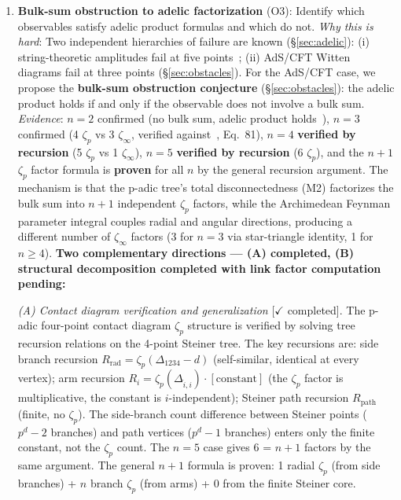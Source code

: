 \documentclass[11pt,a4paper]{article}
\begin{document}
\begin{enumerate}[leftmargin=2em]
    \item \textbf{Bulk-sum obstruction to adelic factorization} (O3): Identify which observables satisfy adelic product formulas and which do not. \textit{Why this is hard}: Two independent hierarchies of failure are known (\S\ref{sec:adelic}): (i) string-theoretic amplitudes fail at five points~\cite{J22}; (ii) AdS/CFT Witten diagrams fail at three points (\S\ref{sec:obstacles}). For the AdS/CFT case, we propose the \textbf{bulk-sum obstruction conjecture} (\S\ref{sec:obstacles}): the adelic product holds if and only if the observable does not involve a bulk sum. \textit{Evidence}: $n=2$ confirmed (no bulk sum, adelic product holds~\cite{HSYZ20}), $n=3$ confirmed (4 $\zeta_p$ vs 3 $\zeta_\infty$, verified against~\cite{HJ24}, Eq.~81), $n=4$ \textbf{verified by recursion} (5 $\zeta_p$ vs 1 $\zeta_\infty$), $n=5$ \textbf{verified by recursion} (6 $\zeta_p$), and the $n{+}1$ $\zeta_p$ factor formula is \textbf{proven} for all $n$ by the general recursion argument. The mechanism is that the p-adic tree's total disconnectedness (M2) factorizes the bulk sum into $n{+}1$ independent $\zeta_p$ factors, while the Archimedean Feynman parameter integral couples radial and angular directions, producing a different number of $\zeta_\infty$ factors (3 for $n=3$ via star-triangle identity, 1 for $n \geq 4$). \textbf{Two complementary directions --- (A) completed, (B) structural decomposition completed with link factor computation pending:}
    
    \textit{(A) Contact diagram verification and generalization} [$\checkmark$ completed]. The p-adic four-point contact diagram $\zeta_p$ structure is verified by solving tree recursion relations on the 4-point Steiner tree. The key recursions are: side branch recursion $R_{\text{rad}} = \zeta_p(\Delta_{1234}{-}d)$ (self-similar, identical at every vertex); arm recursion $R_i = \zeta_p(\Delta_{\hat{i},i}) \cdot [\text{constant}]$ (the $\zeta_p$ factor is multiplicative, the constant is $i$-independent); Steiner path recursion $R_{\text{path}}$ (finite, no $\zeta_p$). The side-branch count difference between Steiner points ($p^d{-}2$ branches) and path vertices ($p^d{-}1$ branches) enters only the finite constant, not the $\zeta_p$ count. The $n=5$ case gives 6 = $n{+}1$ factors by the same argument. The general $n{+}1$ formula is proven: 1 radial $\zeta_p$ (from side branches) + $n$ branch $\zeta_p$ (from arms) + 0 from the finite Steiner core.
    

\end{enumerate}
\end{document}
